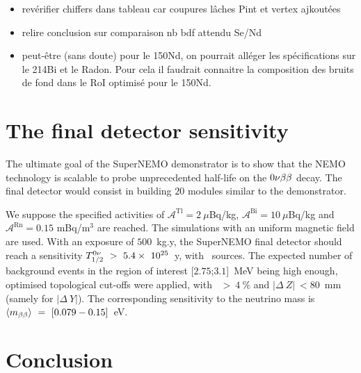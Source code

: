 \begin{itemize}
\item revérifier chiffers dans tableau car coupures lâches Pint et vertex ajkoutées
\item relire conclusion sur comparaison nb bdf attendu Se/Nd
\item peut-être (sans doute) pour le 150Nd, on pourrait alléger les spécifications sur le 214Bi et le Radon. Pour cela il faudrait connaitre la composition des bruits de fond dans le RoI optimisé pour le 150Nd.
\end{itemize}


\section{The final detector sensitivity}

The ultimate goal of the SuperNEMO demonstrator is to show that the NEMO technology is scalable to probe unprecedented half-life on the $0\nu\beta\beta$ decay.
The final detector would consist in building $20$ modules similar to the demonstrator.

We suppose the specified activities of $\mathcal{A}^{\text{Tl}} = 2~\mu$Bq/kg, $\mathcal{A}^{\text{Bi}} = 10~\mu$Bq/kg and $\mathcal{A}^{\text{Rn}} = 0.15$ mBq/m$^{3}$ are reached.
The simulations with an uniform magnetic field are used.
With an exposure of $500$~kg.y, the SuperNEMO final detector should reach a sensitivity $T_{1/2}^{0\nu}~>~5.4\times~10^{25}$~y, with \Se\ sources.
The expected number of background events in the region of interest [$2.75$;$3.1$]~MeV being high enough, optimised topological cut-offs were applied, with \Pint\ $>~4~\%$ and $|\Delta~Z|~<80$~mm (samely for $|\Delta~Y|$).
The corresponding sensitivity to the neutrino mass is $\langle m_{\beta\beta}\rangle~=~[0.079-0.15]$~eV.






\section{Conclusion}

